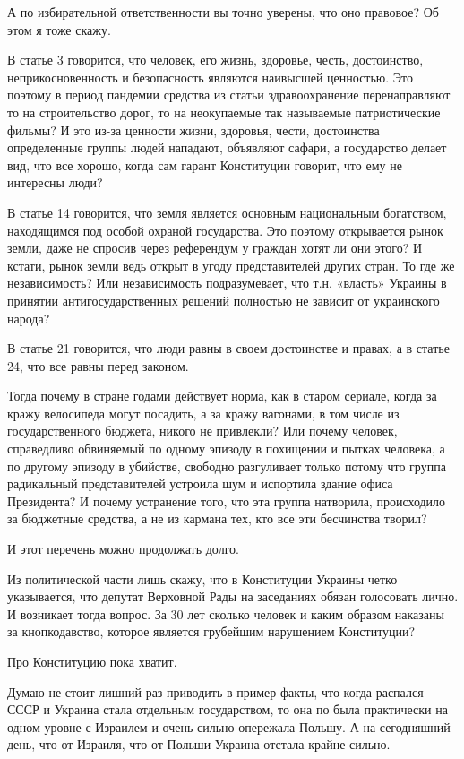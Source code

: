 А по избирательной ответственности вы точно уверены, что оно правовое? Об этом я тоже скажу.

В статье 3 говорится, что человек, его жизнь, здоровье, честь, достоинство,
неприкосновенность и безопасность являются наивысшей ценностью. Это поэтому в
период пандемии средства из статьи здравоохранение перенаправляют то на
строительство дорог, то на неокупаемые так называемые патриотические фильмы? И
это из-за ценности жизни, здоровья, чести, достоинства определенные группы
людей нападают, объявляют сафари, а государство делает вид, что все хорошо,
когда сам гарант Конституции говорит, что ему не интересны люди?

В статье 14 говорится, что земля является основным национальным богатством,
находящимся под особой охраной государства. Это поэтому открывается рынок
земли, даже не спросив через референдум у граждан хотят ли они этого? И кстати,
рынок земли ведь открыт в угоду представителей других стран. То где же
независимость? Или независимость подразумевает, что т.н. «власть» Украины в
принятии антигосударственных решений полностью не зависит от украинского
народа?

В статье 21 говорится, что люди равны в своем достоинстве и правах, а в статье 24, что все равны перед законом.

Тогда почему в стране годами действует норма, как в старом сериале, когда за
кражу велосипеда могут посадить, а за кражу вагонами, в том числе из
государственного бюджета, никого не привлекли? Или почему человек, справедливо
обвиняемый по одному эпизоду в похищении и пытках человека, а по другому
эпизоду в убийстве, свободно разгуливает только потому что группа радикальный
представителей устроила шум и испортила здание офиса Президента? И почему
устранение того, что эта группа натворила, происходило за бюджетные средства, а
не из кармана тех, кто все эти бесчинства творил?

И этот перечень можно продолжать долго.

Из политической части лишь скажу, что в Конституции Украины четко указывается,
что депутат Верховной Рады на заседаниях обязан голосовать лично. И возникает
тогда вопрос. За 30 лет сколько человек и каким образом наказаны за
кнопкодавство, которое является грубейшим нарушением Конституции?

Про Конституцию пока хватит.

Думаю не стоит лишний раз приводить в пример факты, что когда распался СССР и
Украина стала отдельным государством, то она по была практически на одном
уровне с Израилем и очень сильно опережала Польшу. А на сегодняшний день, что
от Израиля, что от Польши Украина отстала крайне сильно.

